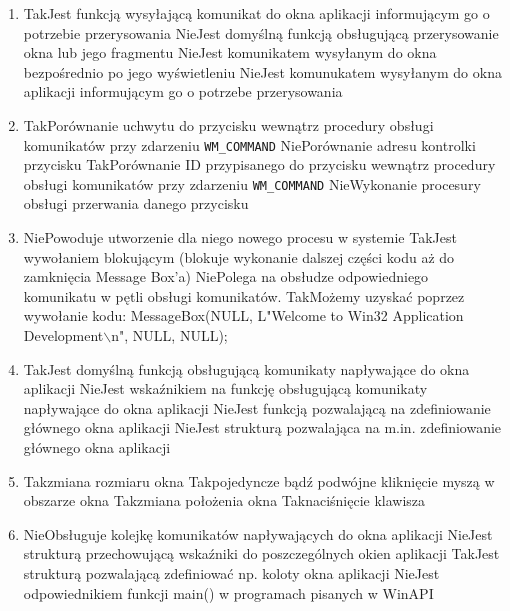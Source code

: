\begin{enumerate}
	\item {}
	{Tak}{Jest funkcją wysyłającą komunikat do okna aplikacji informującym go o potrzebie przerysowania}
	{Nie}{Jest domyślną funkcją obsługującą przerysowanie okna lub jego fragmentu}
	{Nie}{Jest komunikatem wysyłanym do okna bezpośrednio po jego wyświetleniu}
	{Nie}{Jest komunukatem wysyłanym do okna aplikacji informującym go o potrzebe przerysowania}
	
	\item {}
	{Tak}{Porównanie uchwytu do przycisku wewnątrz procedury obsługi komunikatów przy zdarzeniu \texttt{WM\_COMMAND}}
	{Nie}{Porównanie adresu kontrolki przycisku}
	{Tak}{Porównanie ID przypisanego do przycisku wewnątrz procedury obsługi komunikatów przy zdarzeniu \texttt{WM\_COMMAND}}
	{Nie}{Wykonanie procesury obsługi przerwania danego przycisku}
	
	\item {}
	{Nie}{Powoduje utworzenie dla niego nowego procesu w systemie}
	{Tak}{Jest wywołaniem blokującym (blokuje wykonanie dalszej części kodu aż do zamknięcia Message Box'a)}
	{Nie}{Polega na obsłudze odpowiedniego komunikatu w pętli obsługi komunikatów.}
	{Tak}{Możemy uzyskać poprzez wywołanie kodu: MessageBox(NULL, L"Welcome to Win32 Application Development$\backslash$n", NULL, NULL);}
	
	\item {}
	{Tak}{Jest domyślną funkcją obsługującą komunikaty napływające do okna aplikacji}
	{Nie}{Jest wskaźnikiem na funkcję obsługującą komunikaty napływające do okna aplikacji}
	{Nie}{Jest funkcją pozwalającą na zdefiniowanie głównego okna aplikacji}
	{Nie}{Jest strukturą pozwalająca na m.in. zdefiniowanie głównego okna aplikacji}

	\item {}
	{Tak}{zmiana rozmiaru okna}
	{Tak}{pojedyncze bądź podwójne kliknięcie myszą w obszarze okna}
	{Tak}{zmiana położenia okna}
	{Tak}{naciśnięcie klawisza}
	
	\item {}
	{Nie}{Obsługuje kolejkę komunikatów napływających do okna aplikacji}
	{Nie}{Jest strukturą przechowującą wskaźniki do poszczególnych okien aplikacji}
	{Tak}{Jest strukturą pozwalającą zdefiniować np. koloty okna aplikacji}
	{Nie}{Jest odpowiednikiem funkcji main() w programach pisanych w WinAPI}
	
\end{enumerate}